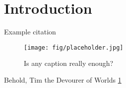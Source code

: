 
\part{Introduction}

Example citation \cite{hauser2008athlete}

\lipsum

\begin{figure}[h]
 \centering
 \texttt{[image: fig/placeholder.jpg]}
 \caption{
  Is any caption really enough?
 }
 \label{fig:placeholder}
\end{figure}

Behold, Tim the Devourer of Worlds \ref{fig:placeholder}
